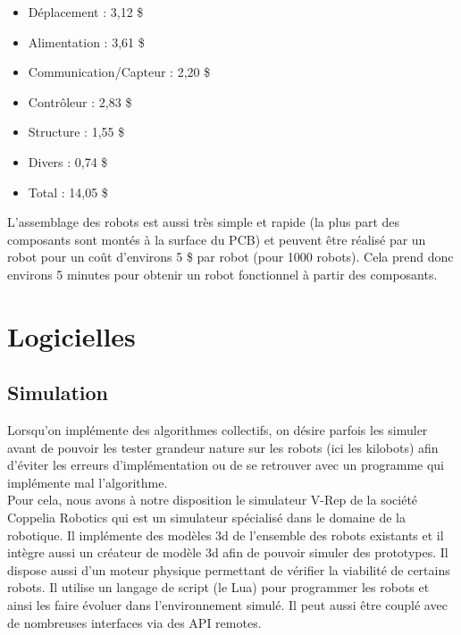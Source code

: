 \documentclass[a4paper,8pt]{report}
\begin{document}
\begin{itemize}
\item D\'eplacement : 3,12 \$
\item Alimentation : 3,61 \$
\item Communication/Capteur : 2,20 \$
\item Contr\^oleur : 2,83 \$
\item Structure : 1,55 \$
\item Divers : 0,74 \$
\item Total : 14,05 \$
\end{itemize}

\medskip
L'assemblage des robots est aussi tr\`es simple et rapide (la plus part des composants sont mont\'es \`a la  surface du PCB) et peuvent \^etre r\'ealis\'e par un robot pour un co\^ut d'environs 5 \$ par robot (pour 1000 robots). Cela prend donc environs 5 minutes pour obtenir un robot fonctionnel \`a partir des composants.\\

\section*{Logicielles}\label{sec:name}

\subsection*{Simulation}\label{subsec:name}

Lorsqu'on impl\'emente des algorithmes collectifs, on d\'esire parfois les simuler avant de pouvoir les tester grandeur nature sur les robots (ici les kilobots) afin d'\'eviter les erreurs d'impl\'ementation ou de se retrouver avec un programme qui impl\'emente mal l'algorithme. \\
Pour cela, nous avons \`a notre disposition le simulateur V-Rep de la soci\'et\'e Coppelia Robotics qui est un simulateur sp\'ecialis\'e dans le domaine de la robotique. Il impl\'emente des mod\`eles 3d de l'ensemble des robots existants et il int\`egre aussi un cr\'eateur de mod\`ele 3d afin de pouvoir simuler des prototypes. Il dispose aussi d'un moteur physique permettant de v\'erifier la viabilit\'e de certains robots. Il utilise un langage de script (le Lua) pour programmer les robots et ainsi les faire \'evoluer dans l'environnement simul\'e. Il peut aussi \^etre coupl\'e avec de nombreuses interfaces via des API remotes.\\
\end{document}
